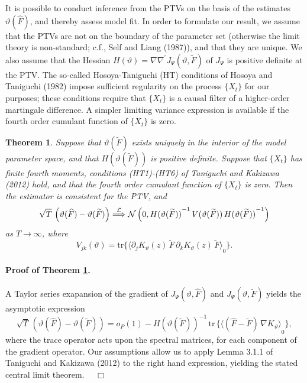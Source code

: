 \documentclass[a4paper]{book}
\def\convinlaw{\stackrel{{\cal L}}{\Longrightarrow }}
\def\tends{\rightarrow}
\newtheorem{Theorem}{Theorem}
\begin{document}

It is possible to conduct inference from the PTVs on the basis of the estimates 
$\vartheta (\widehat{F})$, and thereby assess model fit.  
 In order to formulate our result, we assume that the PTVs are not on the
 boundary of the parameter set (otherwise the limit theory
 is non-standard; c.f., Self and Liang (1987)), and  that they are unique. 
We also assume that the  Hessian  $H(\vartheta) = \nabla \nabla^{\prime}
  J_{\Psi} (\vartheta, \widetilde{F}) $  of $J_{\Psi} $ is positive definite at the PTV.
  The so-called Hosoya-Taniguchi (HT) conditions of Hosoya and Taniguchi (1982) 
impose sufficient regularity   on the process
 $\{ X_t \}$ for our purposes; these conditions require that $\{ X_t \}$ is a 
causal filter of a higher-order martingale difference.  
 A simpler limiting variance expression is available if the fourth order cumulant
 function of $\{ X_t \}$ is zero.  

\begin{Theorem}
\label{thm:LPP-Clt}
 Suppose that $\vartheta (\widetilde{F}) $ exists uniquely in the interior of the model 
 parameter space,   and that $H(\vartheta (\widetilde{F}))$ is 
 positive definite.  Suppose that $\{ X_t \}$ has finite fourth moments, conditions (HT1)-(HT6) of Taniguchi and Kakizawa (2012)
 hold, and that the fourth order cumulant function of $\{ X_t \}$ is zero.  Then the estimator is consistent for the PTV, and
\[
 \sqrt{T} \, \left( \vartheta( \widehat{F} ) - \vartheta (\widetilde{F}) \right) 
 \convinlaw \mathcal{N} \left( 0, { H(\vartheta (\widetilde{F})) }^{-1} \, V (\vartheta (\widetilde{F})) \, { H(\vartheta (\widetilde{F})) }^{-1} \right)
\]
 as $T \tends \infty$, where 
\[
  V_{jk} (\vartheta) =  \mbox{tr} \{ { \langle  \partial_j K_{\vartheta} (z) \, \widetilde{F} \, \partial_k K_{\vartheta} (z) \, \widetilde{F} \rangle }_0 \}.
\]
\end{Theorem}

\paragraph{Proof of Theorem \ref{thm:LPP-Clt}.}
 A Taylor series exapansion of the gradient of $J_{\Psi} (\vartheta, \widehat{F})$ and $J_{\Psi} (\vartheta, \widetilde{F})$ yields the 
 asymptotic expression
\[
  \sqrt{T} \, \left( \vartheta( \widehat{F} ) - \vartheta (\widetilde{F}) \right)  = o_P (1) 
   - { H (\vartheta( \widetilde{F} )) }^{-1} \,  \mbox{tr} \, \{  {  \langle (\widehat{F} - \widetilde{F}) \, \nabla K_{\vartheta} \rangle }_0 \},
\]
 where the trace operator acts upon the spectral matrices, for each component of the gradient operator.  Our assumptions allow
 us to apply Lemma 3.1.1 of Taniguchi and Kakizawa (2012) to the right hand expression, yielding the stated central limit theorem.
 $\quad \Box$
\end{document}
